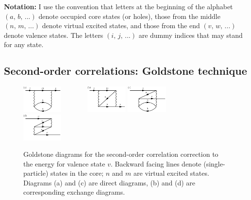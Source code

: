 \documentclass[10pt,twocolumn,a4paper]{article}%
\begin{document}
{\bf Notation:} I use the convention that letters at the beginning of the alphabet {${(a,\,b,\,...)}$} denote occupied core states (or holes),
those from the middle {${(n,\,m,\,...)}$} denote virtual excited states, and
those from the end {${(v,\,w,\,...)}$} denote valence states.
The letters {${(i,\,j,\,...)}$} are dummy indices that may stand for any state.



\subsection{Second-order correlations: Goldstone technique}

\begin{figure}%
\centering\tiny
\includegraphics[width=0.185\textwidth]{img/Sigma/Sigma2_a}~~~~~~~
\includegraphics[width=0.185\textwidth]{img/Sigma/Sigma2_b}
\includegraphics[width=0.185\textwidth]{img/Sigma/Sigma2_c}~~~~~~~
\includegraphics[width=0.185\textwidth]{img/Sigma/Sigma2_d}
\caption{\small Goldstone diagrams for the second-order correlation correction to the energy for valence state $v$. Backward facing lines denote (single-particle) states in the core; $n$ and $m$ are virtual excited states. Diagrams (a) and (c) are direct diagrams, (b) and (d) are corresponding exchange diagrams.\label{fig:Sigma2}}
\end{figure}
\end{document}
